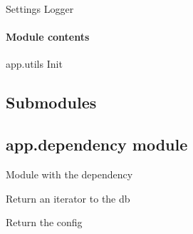 \documentclass[letterpaper,10pt,english]{sphinxmanual}
\begin{document}
\begin{fulllineitems}
\label{\detokenize{app.utils:app.utils.logger.configure_logger}}
\pysigstartsignatures
{}
\pysigstopsignatures
\sphinxAtStartPar
Settings Logger

\end{fulllineitems}



\paragraph{Module contents}
\label{\detokenize{app.utils:module-app.utils}}\label{\detokenize{app.utils:module-contents}}
\sphinxAtStartPar
app.utils Init


\subsection{Submodules}
\label{\detokenize{app:submodules}}

\subsection{app.dependency module}
\label{\detokenize{app:module-app.dependency}}\label{\detokenize{app:app-dependency-module}}
\sphinxAtStartPar
Module with the dependency

\begin{fulllineitems}
\label{\detokenize{app:app.dependency.get_db}}
\pysigstartsignatures
{}
\pysigstopsignatures
\sphinxAtStartPar
Return an iterator to the db

\end{fulllineitems}


\begin{fulllineitems}
\label{\detokenize{app:app.dependency.get_settings}}
\pysigstartsignatures
{}
\pysigstopsignatures
\sphinxAtStartPar
Return the config

\end{fulllineitems}
\end{document}
